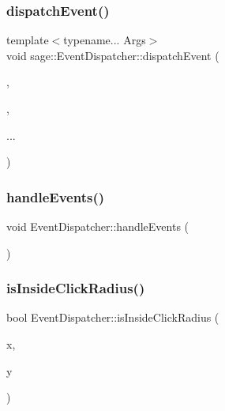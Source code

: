 \subsubsection{\texorpdfstring{dispatchEvent()}{dispatchEvent()}\hspace{0.1cm}{\footnotesize\ttfamily [2/2]}}
{\footnotesize\ttfamily template$<$typename... Args$>$ \\
void sage\+::\+Event\+Dispatcher\+::dispatch\+Event (\begin{DoxyParamCaption}\item[{\mbox{\hyperlink{namespacesage_ad2c7b0e1ebf67f572d43620e6b07aa13}{Node\+Event}}}]{,  }\item[{std\+::function$<$ bool(\mbox{\hyperlink{classsage_1_1Node}{Node}} \&, Args...)$>$ \&\&}]{,  }\item[{Args \&\&}]{... }\end{DoxyParamCaption})}

\mbox{\label{classsage_1_1EventDispatcher_af94b0101f87f16334c1d32ea7a43c02a}} 
\subsubsection{\texorpdfstring{handleEvents()}{handleEvents()}}
{\footnotesize\ttfamily void Event\+Dispatcher\+::handle\+Events (\begin{DoxyParamCaption}{ }\end{DoxyParamCaption})}

\mbox{\label{classsage_1_1EventDispatcher_a918e15fc278d82e1826c5da31b6cc897}} 
\subsubsection{\texorpdfstring{isInsideClickRadius()}{isInsideClickRadius()}}
{\footnotesize\ttfamily bool Event\+Dispatcher\+::is\+Inside\+Click\+Radius (\begin{DoxyParamCaption}\item[{int}]{x,  }\item[{int}]{y }\end{DoxyParamCaption})\hspace{0.3cm}{\ttfamily [private]}}

